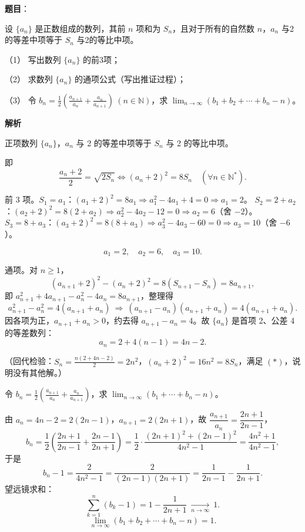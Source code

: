 \begin{answer}

\textbf{题目}：

设 $\{a_n\}$ 是正数组成的数列，其前 $n$ 项和为 $S_n$，且对于所有的自然数 $n$，$a_n$ 与2的等差中项等于 $S_n$ 与2的等比中项。

（1） 写出数列 $\{a_n\}$ 的前3项；

（2） 求数列 $\{a_n\}$ 的通项公式（写出推证过程）；

（3） 令 $b_n=\frac12\left(\frac{a_{n+1}}{a_n}+\frac{a_n}{a_{n+1}}\right)\ (n\in\mathbb N)$，求 $\displaystyle\lim_{n\to\infty}(b_1+b_2+\cdots+b_n-n)$。

\textbf{解析}

正项数列 $\{a_n\}$，$a_n$ 与 2 的等差中项等于 $S_n$ 与 2 的等比中项。

即
\nopagebreak[4]
\[\frac{a_n+2}{2}=\sqrt{2S_n}\iff (a_n+2)^2=8S_n\quad(\forall n\in\mathbb N^*).\tag{$*$}\]


前 3 项。$S_1=a_1$：$(a_1+2)^2=8a_1\Rightarrow a_1^2-4a_1+4=0\Rightarrow a_1=2$。
$S_2=2+a_2$：$(a_2+2)^2=8(2+a_2)\Rightarrow a_2^2-4a_2-12=0\Rightarrow a_2=6$（舍 $-2$）。
$S_3=8+a_3$：$(a_3+2)^2=8(8+a_3)\Rightarrow a_3^2-4a_3-60=0\Rightarrow a_3=10$（舍 $-6$）。

\nopagebreak[4]
\[\boxed{a_1=2,\quad a_2=6,\quad a_3=10.}\]


通项。对 $n\ge1$，
\nopagebreak[4]
\[(a_{n+1}+2)^2-(a_n+2)^2=8(S_{n+1}-S_n)=8a_{n+1},\]
即 $a_{n+1}^2+4a_{n+1}-a_n^2-4a_n=8a_{n+1}$，整理得
\nopagebreak[4]
\[a_{n+1}^2-a_n^2=4(a_{n+1}+a_n)\ \Longrightarrow\ (a_{n+1}-a_n)(a_{n+1}+a_n)=4(a_{n+1}+a_n).\]
因各项为正，$a_{n+1}+a_n>0$，约去得 $a_{n+1}-a_n=4$。故 $\{a_n\}$ 是首项 2、公差 4 的等差数列：
\nopagebreak[4]
\[\boxed{a_n=2+4(n-1)=4n-2.}\]

（回代检验：$S_n=\frac{n(2+4n-2)}2=2n^2$，$(a_n+2)^2=16n^2=8S_n$，满足 $(*)$，说明没有其他解。）


令 $b_n=\frac12\left(\frac{a_{n+1}}{a_n}+\frac{a_n}{a_{n+1}}\right)$，求 $\displaystyle\lim_{n\to\infty}(b_1+\cdots+b_n-n)$。

由 $a_n=4n-2=2(2n-1)$，$a_{n+1}=2(2n+1)$，故 $\dfrac{a_{n+1}}{a_n}=\dfrac{2n+1}{2n-1}$，
\nopagebreak[4]
\[b_n=\frac12\left(\frac{2n+1}{2n-1}+\frac{2n-1}{2n+1}\right)=\frac12\cdot\frac{(2n+1)^2+(2n-1)^2}{4n^2-1}=\frac{4n^2+1}{4n^2-1},\]
于是
\nopagebreak[4]
\[b_n-1=\frac{2}{4n^2-1}=\frac{2}{(2n-1)(2n+1)}=\frac1{2n-1}-\frac1{2n+1}.\]
望远镜求和：
\nopagebreak[4]
\[\sum_{k=1}^n(b_k-1)=1-\frac1{2n+1}\ \xrightarrow[n\to\infty]{}\ 1.\]
\nopagebreak[4]
\[\boxed{\lim_{n\to\infty}(b_1+b_2+\cdots+b_n-n)=1.}\]




\par\medskip

\end{answer}
